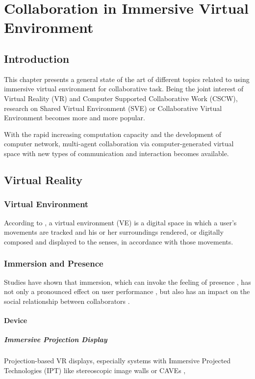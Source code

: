 \chapter{Collaboration in Immersive Virtual Environment}
\label{chapter:context}
\minitoc

\section{Introduction}
This chapter presents a general state of the art of different topics related to using immersive virtual environment for collaborative task. Being the joint interest of Virtual Reality (VR) and Computer Supported Collaborative Work (CSCW), research on Shared Virtual Environment (SVE) or Collaborative Virtual Environment becomes more and more popular.

With the rapid increasing computation capacity and the development of computer network, multi-agent collaboration via computer-generated virtual space with new types of communication and interaction becomes available.

\section{Virtual Reality}

\subsection{Virtual Environment}
According to \citet{Fox2009Guide}, a virtual environment (VE) is a digital space in which a user's movements are tracked and his or her surroundings rendered, or digitally composed and displayed to the senses, in accordance with those movements.


\subsection{Immersion and Presence}
Studies have shown that immersion, which can invoke the feeling of presence \citep{Slater1994DepthPre}, has not only a pronounced effect on user performance \citep{Dangelo2008Benefits}, but also has an impact on the social relationship between collaborators \citep{Slater2000Small}.


\subsubsection{Device}
\paragraph{Immersive Projection Display}
Projection-based VR displays, especially systems with Immersive Projected Technologies (IPT) like stereoscopic image walls or CAVEs \citep{CruzNeira1993SPV}, 


